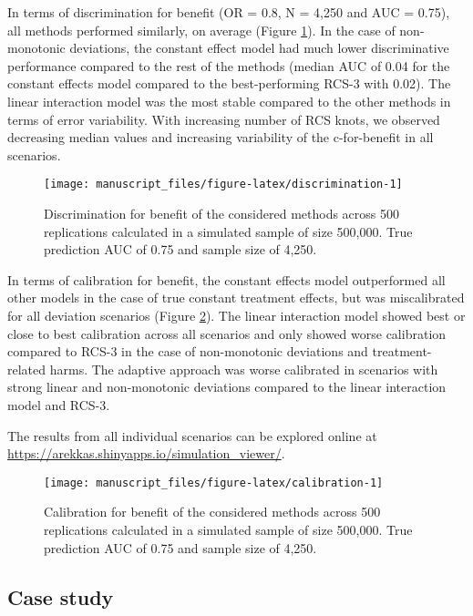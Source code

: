 \documentclass{article}
\begin{document}
In terms of discrimination for benefit (OR = 0.8, N = 4,250 and AUC =
0.75), all methods performed similarly, on average (Figure
\ref{fig:discrimination}). In the case of non-monotonic deviations, the
constant effect model had much lower discriminative performance compared
to the rest of the methods (median AUC of 0.04 for the constant effects
model compared to the best-performing RCS-3 with 0.02). The linear
interaction model was the most stable compared to the other methods in
terms of error variability. With increasing number of RCS knots, we
observed decreasing median values and increasing variability of the
c-for-benefit in all scenarios.

\begin{figure}
\texttt{[image: manuscript\_files/figure-latex/discrimination-1]} \caption{Discrimination for benefit of the considered methods across 500 replications calculated in a simulated sample of size 500,000. True prediction AUC of 0.75 and sample size of 4,250.}\label{fig:discrimination}
\end{figure}

In terms of calibration for benefit, the constant effects model
outperformed all other models in the case of true constant treatment
effects, but was miscalibrated for all deviation scenarios (Figure
\ref{fig:calibration}). The linear interaction model showed best or
close to best calibration across all scenarios and only showed worse
calibration compared to RCS-3 in the case of non-monotonic deviations
and treatment-related harms. The adaptive approach was worse calibrated
in scenarios with strong linear and non-monotonic deviations compared to
the linear interaction model and RCS-3.

The results from all individual scenarios can be explored online at
\url{https://arekkas.shinyapps.io/simulation_viewer/}.

\begin{figure}
\texttt{[image: manuscript\_files/figure-latex/calibration-1]} \caption{Calibration for benefit of the considered methods across 500 replications calculated in a simulated sample of size 500,000. True prediction AUC of 0.75 and sample size of 4,250.}\label{fig:calibration}
\end{figure}

\hypertarget{case-study}{%
\subsection{Case study}\label{case-study}}
\end{document}
